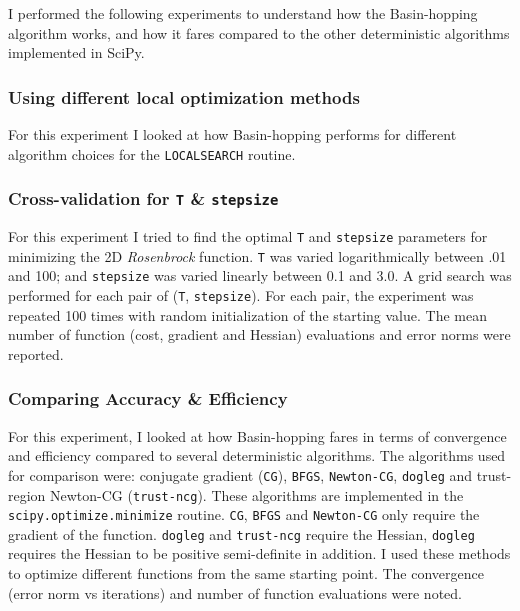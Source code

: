 \documentclass[conference]{IEEEtran}
\begin{document}
I performed the following experiments to understand how the Basin-hopping algorithm works, and how it fares compared to the other deterministic algorithms implemented in SciPy.

\subsubsection{Using different local optimization methods}

For this experiment I looked at how Basin-hopping performs for different algorithm choices for the \texttt{LOCALSEARCH} routine.

\subsubsection{Cross-validation for \texttt{T} \& \texttt{stepsize}}

For this experiment I tried to find the optimal \texttt{T} and \texttt{stepsize} parameters for minimizing the 2D \textit{Rosenbrock} function. \texttt{T} was varied logarithmically between .01 and 100; and \texttt{stepsize} was varied linearly between 0.1 and 3.0. A grid search was performed for each pair of (\texttt{T}, \texttt{stepsize}). For each pair, the experiment was repeated 100 times with random initialization of the starting value. The mean number of function (cost, gradient and Hessian) evaluations and error norms were reported.

\subsubsection{Comparing Accuracy \& Efficiency}

For this experiment, I looked at how Basin-hopping fares in terms of convergence and efficiency compared to several deterministic algorithms. The algorithms used for comparison were: conjugate gradient (\texttt{CG}), \texttt{BFGS}, \texttt{Newton-CG}, \texttt{dogleg} and trust-region Newton-CG (\texttt{trust-ncg}). These algorithms are implemented in the \texttt{scipy.optimize.minimize} routine. \texttt{CG}, \texttt{BFGS} and \texttt{Newton-CG} only require the gradient of the function. \texttt{dogleg} and \texttt{trust-ncg} require the Hessian, \texttt{dogleg} requires the Hessian to be positive semi-definite in addition. I used these methods to optimize different functions from the same starting point. The convergence (error norm vs iterations) and number of function evaluations were noted.
\end{document}
